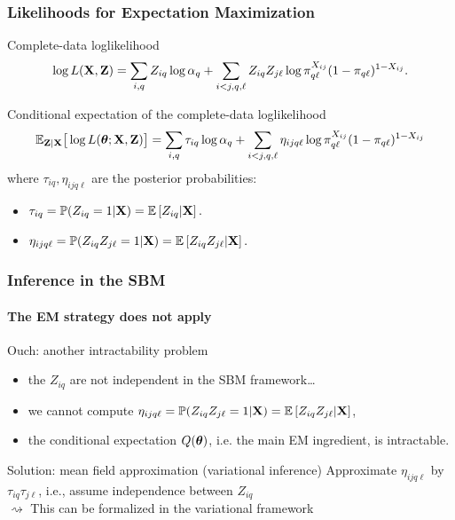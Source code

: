 \documentclass{beamer}\usepackage[]{graphicx}\usepackage[]{color}
\begin{document}
\begin{frame}
  \frametitle{Likelihoods for Expectation Maximization}

  \begin{block}{Complete-data loglikelihood}
    \vspace{-.5cm}
    \begin{equation*}
      \log L(\mathbf{X},\mathbf{Z}) = \sum_{i,q} Z_{iq} \log \alpha_q + \sum_{i<j,q,\ell} Z_{iq}Z_{j\ell} \log \pi_{q\ell}^{X_{ij}} (1-\pi_{q\ell})^{1-X_{ij}}.
    \end{equation*}
  \end{block}

  \begin{block}{Conditional expectation of the complete-data loglikelihood}
    \vspace{-.5cm}
    \begin{equation*}
      \mathbb{E}_{\mathbf{Z}|\mathbf{X}} \big[\log L(\boldsymbol\theta;\mathbf{X},\mathbf{Z}) \big] = \sum_{i,q} \tau_{iq} \log \alpha_q + \sum_{i<j,q,\ell} \eta_{ijq\ell} \log \pi_{q\ell}^{X_{ij}} (1-\pi_{q\ell})^{1-X_{ij}}
    \end{equation*}
      where $\tau_ {iq}, \eta_{ijq\ell}$ are the posterior probabilities:
      \begin{itemize}
        \item $\tau_{iq} = \mathbb{P}(Z_{iq} = 1 | \mathbf{X}) = \mathbb{E} \left[Z_{iq} | \mathbf{X}\right].$
        \item $\eta_{ijq\ell} = \mathbb{P}(Z_{iq}Z_{j\ell} = 1 | \mathbf{X}) = \mathbb{E} \left[Z_{iq}Z_{j\ell} | \mathbf{X}\right].$
      \end{itemize}
  \end{block}

\end{frame}

\begin{frame}
  \frametitle{Inference in the SBM}
  \framesubtitle{The EM strategy does not apply}
  
  \begin{block}{Ouch: another intractability problem}
    \begin{itemize}
      \item the $Z_{iq}$ are \alert{not independent} in the SBM framework\dots
      \item we cannot compute $\eta_{ijq\ell} = \mathbb{P}(Z_{iq}Z_{j\ell} = 1 | \mathbf{X}) = \mathbb{E} \left[Z_{iq}Z_{j\ell} | \mathbf{X}\right]$,
      \item the conditional expectation $Q(\boldsymbol\theta)$, i.e. the main EM ingredient, is \alert{intractable}.
    \end{itemize}
  \end{block}

  \vfill

  \begin{block}{Solution: mean field approximation (variational inference)}
    Approximate $\eta_{ijq\ell}$ by $\tau_{iq}\tau_{j\ell}$, i.e., \alert{assume independence between $Z_{iq}$}\\

    $\rightsquigarrow$ This can be formalized in the variational framework
  \end{block}


\end{frame}
\end{document}
